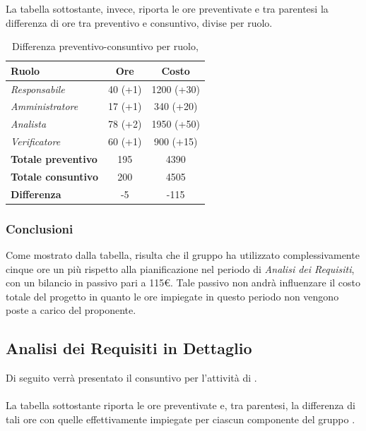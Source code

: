 La tabella sottostante, invece, riporta le ore preventivate e  tra parentesi la differenza di ore tra preventivo e consuntivo, divise per ruolo.

\begin{table}[H]
	\begin{center}
		\begin{tabular}{|l|c|c|}
			\hline
			\textbf{Ruolo}	& \textbf{Ore} & \textbf{Costo} \\
			\hline
			\textit{Responsabile}		&	40 (+1)	&	1200 (+30)	\\
			\hline
			\textit{Amministratore}		&	17 (+1)	&	340 (+20)	\\
			\hline
			\textit{Analista}			&	78 (+2)	&	1950 (+50)	\\
			\hline
			\textit{Verificatore}		&	60 (+1)	&	900 (+15)	\\
			\hline
			\textbf{Totale preventivo}	&	195		&	4390 		\\
			\hline
			\textbf{Totale consuntivo}	&	200		&   4505		\\
			\hline
			\textbf{Differenza} 		&	-5		&	-115		\\
			\hline
		\end{tabular}
	\end{center}
	\caption{Differenza preventivo-consuntivo per ruolo, \AdR}
\end{table}
 
\subsubsection{Conclusioni}

Come mostrato dalla tabella, risulta che il gruppo ha utilizzato complessivamente cinque ore un più rispetto alla pianificazione nel periodo di \textit{Analisi dei Requisiti}, con un bilancio in passivo pari a 115€. Tale passivo non andrà influenzare il costo totale del progetto in quanto le ore impiegate in questo periodo non vengono poste a carico del proponente.

\subsection{Analisi dei Requisiti in Dettaglio}
Di seguito verrà presentato il consuntivo per l'attività di \textit{\AD}.
\\\\
La tabella sottostante riporta le ore preventivate e, tra parentesi, la differenza di tali ore con quelle effettivamente impiegate per ciascun componente del gruppo \gruppo.

